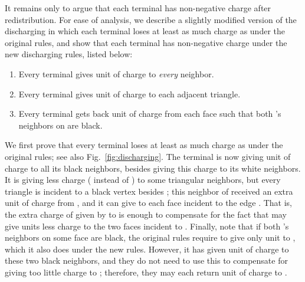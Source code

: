 \documentclass[11pt]{article}
\renewenvironment{proof}{\vspace{-0.1in}\noindent{\bf Proof:}}{\hspace*{\fill}\par}
\begin{document}
\begin{proof}
  \bigskip It remains only to argue that each terminal  has
  non-negative charge after redistribution. For ease of analysis, we
  describe a slightly modified version of the discharging in which
  each terminal loses at least as much charge as under the original
  rules, and show that each terminal has non-negative charge under the
  new discharging rules, listed below:
  \begin{enumerate}
  \item Every terminal  gives  unit of charge to \emph{every}
    neighbor.

  \item Every terminal  gives  unit of charge to each
    adjacent triangle.

  \item Every terminal  gets back  unit of charge from each face
     such that both 's neighbors on  are black.
  \end{enumerate}
  
  We first prove that every terminal  loses at least as much charge
  as under the original rules; see also Fig.~\ref{fig:discharging}.
  The terminal  is now giving  unit of charge to all its black
  neighbors, besides giving this charge to its white neighbors. It is
  giving less charge ( instead of ) to some triangular
  neighbors, but every triangle is incident to a black vertex 
  besides ; this neighbor of  received an extra  unit of
  charge from , and it can give  to each face
  incident to the edge . That is, the extra charge of 
  given by  to  is enough to compensate for the fact that 
  may give  units less charge to the two faces incident to
  . Finally, note that if both 's neighbors on some face 
  are black, the original rules require  to give only  unit to
  , which it also does under the new rules. However, it has given
   unit of charge to these two black neighbors, and they do not
  need to use this to compensate for  giving too little charge to
  ; therefore, they may each return  unit of charge to .

  \begin{figure}[h]
    \begin{center}
\end{center}
\end{figure}
\end{proof}
\end{document}
